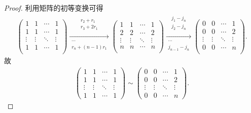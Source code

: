 \documentclass[../../main.tex]{subfiles}%
\begin{document}
\begin{proof}
利用矩阵的初等变换可得
\begin{align*}
\left( \begin{matrix}
1&		1&		\cdots&		1\\
1&		1&		\cdots&		1\\
\vdots&		\vdots&		\ddots&		\vdots\\
1&		1&		\cdots&		1\\
\end{matrix} \right) \xrightarrow[\begin{array}{c}
\cdots\\
r_n+\left( n-1 \right) r_1\\
\end{array}]{\begin{array}{c}
r_2+r_1\\
r_3+2r_1\\
\end{array}}\left( \begin{matrix}
1&		1&		\cdots&		1\\
2&		2&		\cdots&		2\\
\vdots&		\vdots&		\ddots&		\vdots\\
n&		n&		\cdots&		n\\
\end{matrix} \right) \xrightarrow[\begin{array}{c}
\cdots\\
j_{n-1}-j_n\\
\end{array}]{\begin{array}{c}
j_1-j_n\\
j_2-j_n\\
\end{array}}\left( \begin{matrix}
0&		0&		\cdots&		1\\
0&		0&		\cdots&		2\\
\vdots&		\vdots&		\ddots&		\vdots\\
0&		0&		\cdots&		n\\
\end{matrix} \right) .
\end{align*}
故
\begin{align*}
\left( \begin{matrix}
1&1&\cdots&1\\
1&1&\cdots&1\\
\vdots&\vdots&\ddots&\vdots\\
1&1&\cdots&1
\end{matrix} \right) 
\sim
\left( \begin{matrix}
0&0&\cdots&1\\
0&0&\cdots&2\\
\vdots&\vdots&\ddots&\vdots\\
0&0&\cdots&n
\end{matrix} \right).
\end{align*} 
\end{proof}
\end{document}
